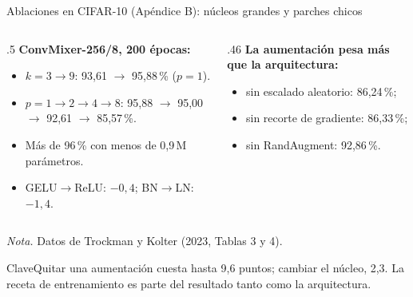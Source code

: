 \documentclass[aspectratio=169,xcolor=table]{beamer}
\newcommand{\fuente}[1]{\vfill{\fontsize{5.5}{6.5}\selectfont\color{gray}#1\par}}
\newcommand{\clave}[1]{\vfill\begin{alertblock}{Clave}\footnotesize #1\end{alertblock}}
\begin{document}
\begin{frame}{Ablaciones en CIFAR-10 (Apéndice B): núcleos grandes y parches chicos}
  \begin{columns}[T]
    \begin{column}{.5\textwidth}
      \small
      \textbf{ConvMixer-256/8, 200 épocas:}
      \begin{itemize}
        \item $k=3\to9$: 93,61 $\to$ 95,88\,\% ($p=1$).
        \item $p=1\to2\to4\to8$: 95,88 $\to$ 95,00 $\to$ 92,61 $\to$ 85,57\,\%.
        \item Más de 96\,\% con menos de 0,9\,M parámetros.
        \item GELU$\to$ReLU: $-0{,}4$; BN$\to$LN: $-1{,}4$.
      \end{itemize}
    \end{column}
    \begin{column}{.46\textwidth}
      \small
      \textbf{La aumentación pesa más que la arquitectura:}
      \begin{itemize}
        \item sin escalado aleatorio: 86,24\,\%;
        \item sin recorte de gradiente: 86,33\,\%;
        \item sin RandAugment: 92,86\,\%.
      \end{itemize}
    \end{column}
  \end{columns}
  \fuente{\textit{Nota.} Datos de Trockman y Kolter (2023, Tablas 3 y 4).}
  \clave{Quitar una aumentación cuesta hasta 9,6 puntos; cambiar el núcleo, 2,3. La receta de entrenamiento es
  parte del resultado tanto como la arquitectura.}
\end{frame}
\end{document}
